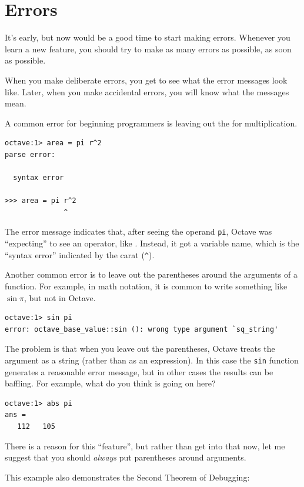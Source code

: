 \documentclass{book}
\begin{document}
\section{Errors}

It's early, but now would be a good time to start making errors.
Whenever you learn a new feature, you should try
to make as many errors as possible, as soon as possible.

When you make deliberate errors, you get to see what the error messages
look like. Later, when you make accidental errors, you will know what
the messages mean.

A common error for beginning programmers is leaving out the {\tt *}
for multiplication.

\begin{verbatim}
octave:1> area = pi r^2
parse error:

  syntax error

>>> area = pi r^2
              ^
\end{verbatim}

The error message indicates that, after seeing the operand {\tt pi},
Octave was ``expecting'' to see an operator, like {\tt *}. Instead,
it got a variable name, which is the ``syntax error'' indicated
by the carat (\verb+^+).

Another common error is to leave out the parentheses around the
arguments of a function. For example, in math notation, it is common
to write something like $\sin \pi$, but not in Octave.

\begin{verbatim}
octave:1> sin pi
error: octave_base_value::sin (): wrong type argument `sq_string'
\end{verbatim}

The problem is that when you leave out the parentheses, Octave treats
the argument as a string (rather than as an expression). In
this case the {\tt sin} function generates a reasonable error message,
but in other cases the results can be baffling. For example, what
do you think is going on here?

\begin{verbatim}
octave:1> abs pi
ans =
   112   105
\end{verbatim}

There is a reason for this ``feature'', but rather than get into that
now, let me suggest that you should {\em always} put parentheses around
arguments.

This example also demonstrates the Second Theorem of Debugging:
\end{document}
